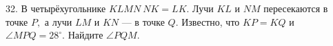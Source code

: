 32. В четырёхугольнике $KLMN\ NK=LK.$ Лучи $KL$ и $NM$ пересекаются в точке $P,$ а лучи $LM$ и $KN$ --- в точке $Q.$ Известно, что $KP=KQ$ и $\angle MPQ=28^\circ.$ Найдите $\angle PQM.$\\
